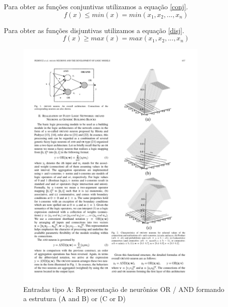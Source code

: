 \documentclass{IEEEtran}
\begin{document}
Para obter as funções conjuntivas utilizamos a equação \ref{conj}.
\begin{equation} \label{conj}
  f(x) \leq min(x) = min(x_1,x_2, ..., x_n)
\end{equation}

Para obter as funções disjuntivas utilizamos a equação \ref{disj}.
\begin{equation} \label{disj}
  f(x) \geq max(x) = max(x_1,x_2, ..., x_n)
\end{equation}

\begin{figure}
	\centering
	\includegraphics[width=95mm]{AandBorZ.pdf}
	\caption{Entradas tipo A: Representação de neurônios OR / AND formando a estrutura (A and B) or (C or D)}
	\label{neur}
\end{figure}
\end{document}
